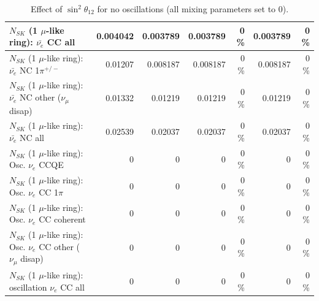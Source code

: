 \begin{table}
\begin{tabular}{| l | r | r | r  r | r  r |}
                            $N_{SK}$ (1 $\mu$-like ring): $\bar{\nu_{e}}$ CC all &        0.004042 &        0.003789 &        0.003789 &        0 \%  &        0.003789 &        0 \%  \\ 
\hline
                     $N_{SK}$ (1 $\mu$-like ring): $\bar{\nu_e}$ NC 1$\pi^{+/-}$ &         0.01207 &        0.008187 &        0.008187 &        0 \%  &        0.008187 &        0 \%  \\ 
          $N_{SK}$ (1 $\mu$-like ring): $\bar{\nu_e}$ NC other ($\nu_\mu$ disap) &         0.01332 &         0.01219 &         0.01219 &        0 \%  &         0.01219 &        0 \%  \\ 
                            $N_{SK}$ (1 $\mu$-like ring): $\bar{\nu_{e}}$ NC all &         0.02539 &         0.02037 &         0.02037 &        0 \%  &         0.02037 &        0 \%  \\ 
\hline
\hline
\hline
                                 $N_{SK}$ (1 $\mu$-like ring): Osc. $\nu_e$ CCQE &               0 &               0 &               0 &        0 \%  &               0 &        0 \%  \\ 
                            $N_{SK}$ (1 $\mu$-like ring): Osc. $\nu_e$ CC 1$\pi$ &               0 &               0 &               0 &        0 \%  &               0 &        0 \%  \\ 
                          $N_{SK}$ (1 $\mu$-like ring): Osc. $\nu_e$ CC coherent &               0 &               0 &               0 &        0 \%  &               0 &        0 \%  \\ 
           $N_{SK}$ (1 $\mu$-like ring): Osc. $\nu_e$ CC other ($\nu_\mu$ disap) &               0 &               0 &               0 &        0 \%  &               0 &        0 \%  \\ 
                        $N_{SK}$ (1 $\mu$-like ring): oscillation $\nu_e$ CC all &               0 &               0 &               0 &        0 \%  &               0 &        0 \%  \\ 
\hline
\hline
\end{tabular}
\caption{ Effect of $\sin^2\theta_{12}$ for no oscillations (all mixing parameters set to 0). }
\label{tab:num_mixing12_1RmuT_3f_osc_t13:0}
\end{table}
\clearpage
